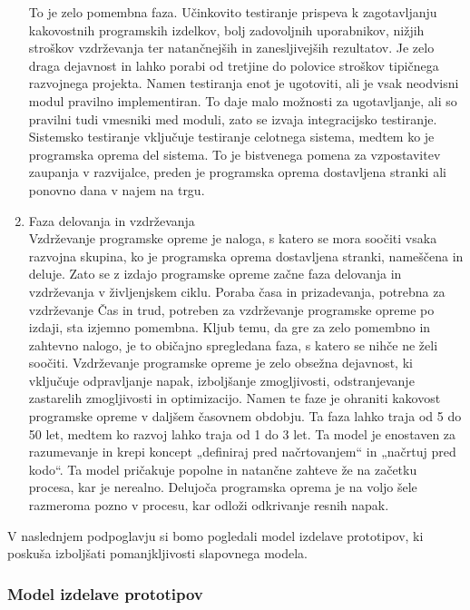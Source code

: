 \documentclass[a4paper,12pt,openright]{book}
\begin{document}
\begin{enumerate}
     To je zelo pomembna faza. Učinkovito testiranje prispeva k zagotavljanju kakovostnih programskih izdelkov, bolj zadovoljnih uporabnikov, nižjih stroškov vzdrževanja ter natančnejših in zanesljivejših rezultatov. Je zelo draga dejavnost in lahko porabi od tretjine do polovice stroškov tipičnega razvojnega projekta.
Namen testiranja enot je ugotoviti, ali je vsak neodvisni modul pravilno implementiran. To daje malo možnosti za ugotavljanje, ali so pravilni tudi vmesniki med moduli, zato se izvaja integracijsko testiranje. Sistemsko testiranje vključuje testiranje celotnega sistema, medtem ko je programska oprema del sistema. To je bistvenega pomena za vzpostavitev zaupanja v razvijalce, preden je programska oprema dostavljena stranki ali ponovno dana v najem na trgu.
    \item Faza delovanja in vzdrževanja \\
    Vzdrževanje programske opreme je naloga, s katero se mora soočiti vsaka razvojna skupina, ko je programska oprema dostavljena stranki, nameščena in deluje. Zato se z izdajo programske opreme začne faza delovanja in vzdrževanja v življenjskem ciklu.
Poraba časa in prizadevanja, potrebna za vzdrževanje Čas in trud, potreben za vzdrževanje programske opreme po izdaji, sta izjemno pomembna. Kljub temu, da gre za zelo pomembno in zahtevno nalogo, je to običajno spregledana faza, s katero se nihče ne želi soočiti.
Vzdrževanje programske opreme je zelo obsežna dejavnost, ki vključuje odpravljanje napak, izboljšanje zmogljivosti, odstranjevanje zastarelih zmogljivosti in optimizacijo. Namen te faze je ohraniti kakovost programske opreme v daljšem časovnem obdobju. Ta faza lahko traja od 5 do 50 let, medtem ko razvoj lahko traja od 1 do 3 let.
Ta model je enostaven za razumevanje in krepi koncept „definiraj pred načrtovanjem“ in „načrtuj pred kodo“. Ta model pričakuje popolne in natančne zahteve že na začetku procesa, kar je nerealno. Delujoča programska oprema je na voljo šele razmeroma pozno v procesu, kar odloži odkrivanje resnih napak.
\cite{aggarwal2005software, alshamrani2015comparison}
\end{enumerate}

V naslednjem podpoglavju si bomo pogledali model izdelave prototipov, ki poskuša izboljšati pomanjkljivosti slapovnega modela.


\pagebreak
\subsubsection{Model izdelave prototipov}
\end{document}

